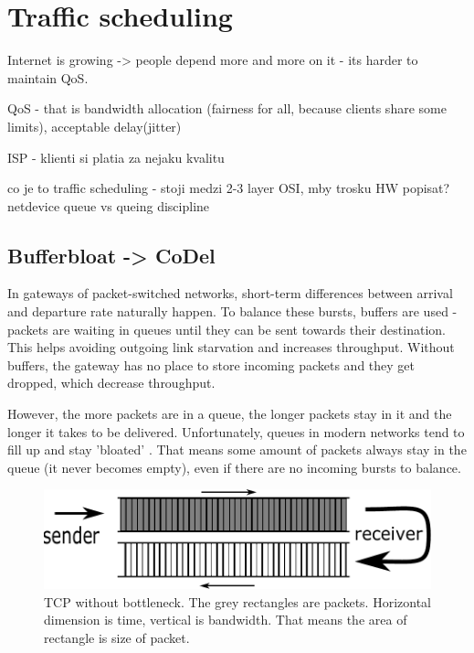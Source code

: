 \chapter{Traffic scheduling}
\label{chap:gf}

Internet is growing -> people depend more and more on it - its harder to maintain QoS.

 QoS - that is bandwidth allocation (fairness for all, because clients share some limits), acceptable delay(jitter)
 
ISP - klienti si platia za nejaku kvalitu

co je to traffic scheduling - stoji medzi 2-3 layer OSI, mby trosku HW popisat? netdevice queue vs queing discipline 

\section{Bufferbloat -> CoDel}


In gateways of packet-switched networks, short-term differences between arrival and departure rate naturally happen. To balance these bursts, buffers are used - packets are waiting in queues until they can be sent towards their destination. This helps avoiding outgoing link starvation and increases throughput. Without buffers, the gateway has no place to store incoming packets and they get dropped, which decrease throughput.


However, the more packets are in a queue, the longer packets stay in it and the longer it takes to be delivered. Unfortunately, queues in modern networks tend to fill up and stay 'bloated' \cite{Gettys:2012:BDB:2063176.2063196}. That means some amount of packets always stay in the queue (it never becomes empty), even if there are no incoming bursts to balance.

\begin{figure}
	\centering

\includegraphics[width=137mm]{drawings/tcp_no_bottleneck}
\caption{TCP without bottleneck. The grey rectangles are packets. Horizontal dimension is time, vertical is bandwidth. That means the area of rectangle is size of packet.}

\label{fig01:no_bottle}
\end{figure}

